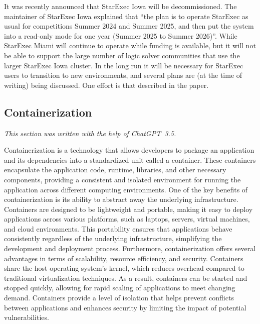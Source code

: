 \documentclass{easychair}
\newcommand{\dav}[1]{{\color{red}{David: {#1}}}}
\begin{document}
It was recently announced that StarExec Iowa will be decommissioned. 
The maintainer of StarExec Iowa explained that ``the plan is to operate StarExec as usual for 
competitions Summer 2024 and Summer 2025, and then put the system into a read-only mode for one 
year (Summer 2025 to Summer 2026)''.
While StarExec Miami will continue to operate while funding is available, but it will not be able
to support the large number of logic solver communities that use the larger StarExec Iowa cluster.
In the long run it will be necessary for StarExec users to transition to new environments,
and several plans are (at the time of writing) being discussed.
One effort is that described in the paper.

\subsection{Containerization}
\label{Containerization}

{\em This section was written with the help of ChatGPT~3.5.}
\dav{I will rewrite this section}

Containerization is a technology that allows developers to package an application and its 
dependencies into a standardized unit called a container. 
These containers encapsulate the application code, runtime, libraries, and other necessary 
components, providing a consistent and isolated environment for running the application 
across different computing environments.
One of the key benefits of containerization is its ability to abstract away the underlying 
infrastructure. 
Containers are designed to be lightweight and portable, making it easy to deploy applications 
across various platforms, such as laptops, servers, virtual machines, and cloud environments. 
This portability ensures that applications behave consistently regardless of the underlying 
infrastructure, simplifying the development and deployment process.
Furthermore, containerization offers several advantages in terms of scalability, resource 
efficiency, and security. 
Containers share the host operating system's kernel, which reduces overhead compared to 
traditional virtualization techniques. 
As a result, containers can be started and stopped quickly, allowing for rapid scaling of 
applications to meet changing demand. 
Containers provide a level of isolation that helps prevent conflicts between applications and 
enhances security by limiting the impact of potential vulnerabilities.
\end{document}
